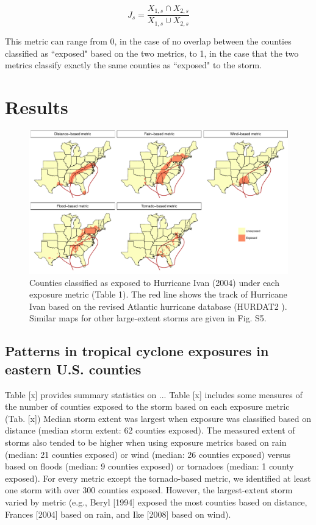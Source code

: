 \documentclass[fleqn,10pt,lineno]{olplainarticle}
\begin{document}
\begin{equation} 
J_s = \frac{X_{1,s} \cap X_{2,s}}{X_{1,s} \cup X_{2,s}}
\end{equation}

This metric can range from 0, in the case of no overlap between the counties
classified as ``exposed" based on the two metrics, to 1, in the case that the
two metrics classify exactly the same counties as ``exposed" to the storm.

\section*{Results}

\begin{figure}%
\centering 
\includegraphics[width=16cm]{ivanonly}
\caption{Counties classified as exposed to Hurricane Ivan (2004) under each
exposure metric (Table 1). The red line shows the track of Hurricane Ivan 
based on the revised Atlantic hurricane database (HURDAT2 \citep{landsea2013}).
Similar maps for other large-extent storms are given in Fig. S5.}
\label{fig:ivanexposure} 
\end{figure}

\subsection*{Patterns in tropical cyclone exposures in eastern U.S. counties}

Table [x] provides summary statistics on ...  Table [x] includes some measures
of the number of counties exposed to the storm based on each exposure metric
(Tab. [x]) Median storm extent was largest when exposure was classified based
on distance (median storm extent: 62 counties exposed). The measured extent of
storms also tended to be higher when using exposure metrics based on rain
(median: 21 counties exposed) or wind (median: 26 counties exposed) versus
based on floods (median: 9 counties exposed) or tornadoes (median: 1 county
exposed).  For every metric except the tornado-based metric, we identified at
least one storm with over 300 counties exposed. However, the largest-extent
storm varied by metric (e.g., Beryl [1994] exposed the most counties based on
distance, Frances [2004] based on rain, and Ike [2008] based on wind).
\end{document}
